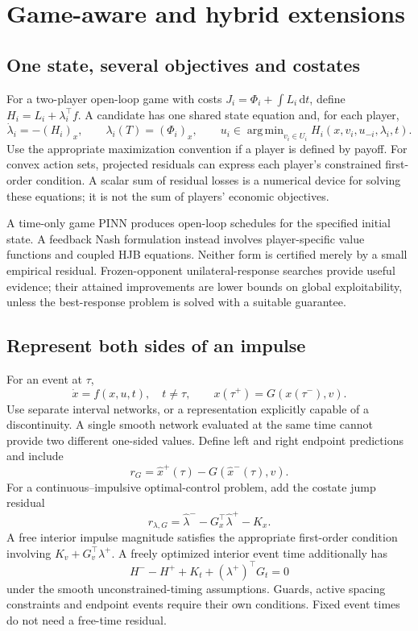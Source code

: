 \documentclass[11pt,a4paper]{article}
\newcommand{\dd}{\,\mathrm{d}}
\DeclareMathOperator*{\argmin}{arg\,min}
\theoremstyle{definition}
\theoremstyle{remark}
\begin{document}
\section{Game-aware and hybrid extensions}
\subsection{One state, several objectives and costates}
For a two-player open-loop game with costs $J_i=\Phi_i+\int L_i\dd t$, define
$H_i=L_i+\lambda_i^\top f$. A candidate has one shared state equation and, for each player,
\begin{equation}
\dot\lambda_i=-(H_i)_x,\qquad
\lambda_i(T)=(\Phi_i)_x,\qquad
u_i\in\argmin_{v_i\in U_i}H_i(x,v_i,u_{-i},\lambda_i,t).
\end{equation}
Use the appropriate maximization convention if a player is defined by payoff. For convex action sets, projected residuals can express each player's constrained first-order condition. A scalar sum of residual losses is a numerical device for solving these equations; it is not the sum of players' economic objectives.

A time-only game PINN produces open-loop schedules for the specified initial state. A feedback Nash formulation instead involves player-specific value functions and coupled HJB equations. Neither form is certified merely by a small empirical residual. Frozen-opponent unilateral-response searches provide useful evidence; their attained improvements are lower bounds on global exploitability, unless the best-response problem is solved with a suitable guarantee.

\subsection{Represent both sides of an impulse}
For an event at $\tau$,
\begin{equation}
\dot x=f(x,u,t),\quad t\ne\tau,\qquad x(\tau^+)=G(x(\tau^-),v).
\end{equation}
Use separate interval networks, or a representation explicitly capable of a discontinuity. A single smooth network evaluated at the same time cannot provide two different one-sided values. Define left and right endpoint predictions and include
\begin{equation}
r_G=\hat x^+(\tau)-G(\hat x^-(\tau),v).
\end{equation}
For a continuous--impulsive optimal-control problem, add the costate jump residual
\begin{equation}
r_{\lambda,G}=\hat\lambda^- -G_x^\top\hat\lambda^+-K_x.
\end{equation}
A free interior impulse magnitude satisfies the appropriate first-order condition involving $K_v+G_v^\top\lambda^+$. A freely optimized interior event time additionally has
\begin{equation}
H^- -H^+ +K_t+(\lambda^+)^\top G_t=0
\end{equation}
under the smooth unconstrained-timing assumptions. Guards, active spacing constraints and endpoint events require their own conditions. Fixed event times do not need a free-time residual.
\end{document}
